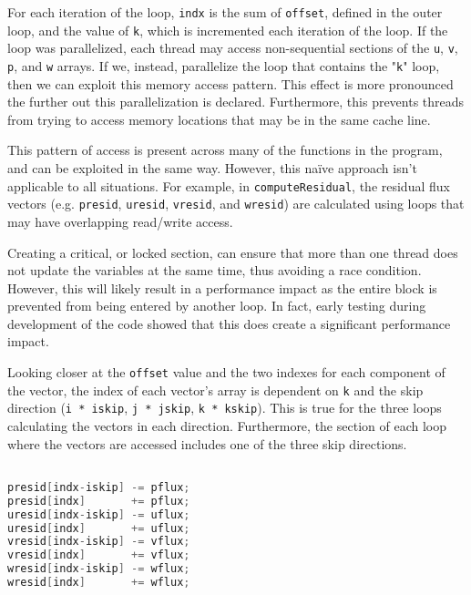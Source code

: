 \documentclass{article}
\begin{document}
  For each iteration of the loop, \verb|indx| is the sum of \verb|offset|,
  defined in the outer loop, and the value of \verb|k|, which is incremented
  each iteration of the loop. If the loop was parallelized, each thread may
  access non-sequential sections of the \verb|u|, \verb|v|, \verb|p|, and
  \verb|w| arrays. If we, instead, parallelize the loop that contains the
  "\verb|k|" loop, then we can exploit this memory access pattern. This effect
  is more pronounced the further out this parallelization is declared.
  Furthermore, this prevents threads from trying to access memory locations
  that may be in the same cache line. 
  
  This pattern of access is present across many of the functions in the 
  program, and can be exploited in the same way. However, this na\"{i}ve 
  approach isn't applicable to all situations. For example, in 
  \verb|computeResidual|, the residual flux vectors (e.g. \verb|presid|, 
  \verb|uresid|, \verb|vresid|, and \verb|wresid|) are calculated using loops
  that may have overlapping read/write access.

  Creating a critical, or locked section, can ensure that more than one thread 
  does not update the variables at the same time, thus avoiding a race 
  condition. However, this will likely result in a performance impact as the 
  entire block is prevented from being entered by another loop. In fact, early 
  testing during development of the code showed that this does create a 
  significant performance impact.

  Looking closer at the \verb|offset| value and the two indexes for each
  component of the vector, the index of each vector's array is dependent on
  \verb|k| and the skip direction (\verb|i * iskip|, \verb|j * jskip|, 
  \verb|k * kskip|). This is true for the three loops calculating the vectors
  in each direction. Furthermore, the section of each loop where the vectors
  are accessed includes one of the three skip directions.

  \begin{lstlisting}[language=C, 
                     linewidth=1\textwidth,
                     breaklines=true, 
                     basicstyle=\small\ttfamily]

presid[indx-iskip] -= pflux;
presid[indx]       += pflux;
uresid[indx-iskip] -= uflux;
uresid[indx]       += uflux;
vresid[indx-iskip] -= vflux;
vresid[indx]       += vflux;
wresid[indx-iskip] -= wflux;
wresid[indx]       += wflux;

  \end{lstlisting}
\end{document}
